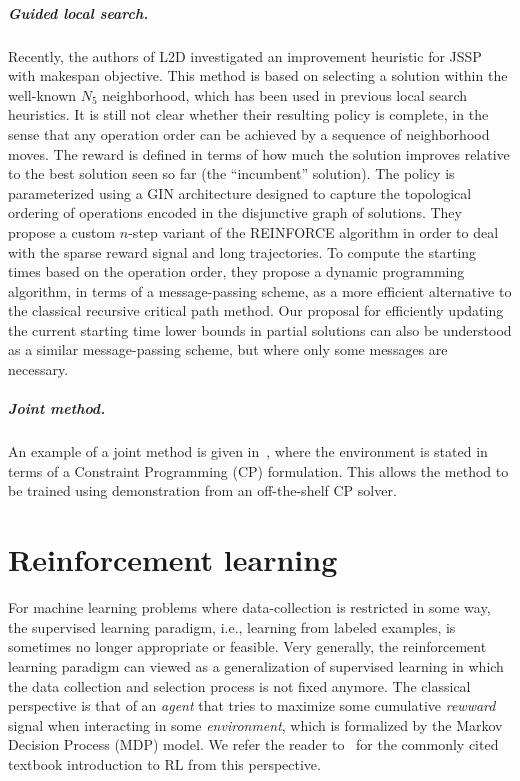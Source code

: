 \documentclass[a4paper]{report}
\theoremstyle{definition}
\theoremstyle{plain}
\begin{document}
\paragraph{Guided local search.}
Recently, the authors of L2D investigated an improvement heuristic for
JSSP~\cite{zhangDeepReinforcementLearning2024} with makespan objective.
%
This method is based on selecting a solution within the well-known $N_5$
neighborhood, which has been used in previous local search heuristics.
%
It is still not clear whether their resulting policy is complete, in the sense
that any operation order can be achieved by a sequence of neighborhood moves.
%
The reward is defined in terms of how much the solution improves relative to the
best solution seen so far (the ``incumbent'' solution). The policy is
parameterized using a GIN architecture designed to capture the topological
ordering of operations encoded in the disjunctive graph of solutions. They
propose a custom $n$-step variant of the REINFORCE algorithm in order to deal
with the sparse reward signal and long trajectories.
%
To compute the starting times based on the operation order, they propose a
dynamic programming algorithm, in terms of a message-passing scheme, as a more
efficient alternative to the classical recursive critical path method.
%
Our proposal for efficiently updating the current starting time lower bounds in
partial solutions can also be understood as a similar message-passing scheme,
but where only some messages are necessary.

\paragraph{Joint method.}
An example of a joint method is given
in~\cite{tasselEndEndReinforcementLearning2023}, where the environment is stated
in terms of a Constraint Programming (CP) formulation. This allows the method to
be trained using demonstration from an off-the-shelf CP solver.


\chapter{Reinforcement learning}

For machine learning problems where data-collection is restricted in some way,
the supervised learning paradigm, i.e., learning from labeled examples, is
sometimes no longer appropriate or feasible.
%
Very generally, the reinforcement learning paradigm can viewed as a
generalization of supervised learning in which the data collection and selection
process is not fixed anymore.
%
The classical perspective is that of an \emph{agent} that tries to maximize some
cumulative \emph{rewward} signal when interacting in some \emph{environment},
which is formalized by the Markov Decision Process (MDP) model.
%
We refer the reader to~\cite{suttonReinforcementLearningIntroduction2018} for the commonly cited textbook introduction to RL
from this perspective.
\end{document}
